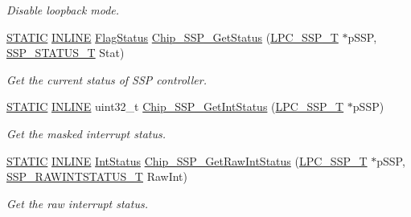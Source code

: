 \begin{DoxyCompactItemize}
\begin{DoxyCompactList}\small\item\em Disable loopback mode. \end{DoxyCompactList}\item 
\hyperlink{group___l_p_c___types___public___macros_ga10b2d890d871e1489bb02b7e70d9bdfb}{S\+T\+A\+T\+IC} \hyperlink{spifi__18xx__43xx_8h_a2eb6f9e0395b47b8d5e3eeae4fe0c116}{I\+N\+L\+I\+NE} \hyperlink{group___l_p_c___types___public___types_ga89136caac2e14c55151f527ac02daaff}{Flag\+Status} \hyperlink{group___s_s_p__18_x_x__43_x_x_ga82dd278bcdbd80eaacc43abc211a970f}{Chip\+\_\+\+S\+S\+P\+\_\+\+Get\+Status} (\hyperlink{struct_l_p_c___s_s_p___t}{L\+P\+C\+\_\+\+S\+S\+P\+\_\+T} $\ast$p\+S\+SP, \hyperlink{group___s_s_p__18_x_x__43_x_x_gad95eaf4325a2ec8e457b309d21d6987d}{S\+S\+P\+\_\+\+S\+T\+A\+T\+U\+S\+\_\+T} Stat)
\begin{DoxyCompactList}\small\item\em Get the current status of S\+SP controller. \end{DoxyCompactList}\item 
\hyperlink{group___l_p_c___types___public___macros_ga10b2d890d871e1489bb02b7e70d9bdfb}{S\+T\+A\+T\+IC} \hyperlink{spifi__18xx__43xx_8h_a2eb6f9e0395b47b8d5e3eeae4fe0c116}{I\+N\+L\+I\+NE} uint32\+\_\+t \hyperlink{group___s_s_p__18_x_x__43_x_x_ga207244e33021333a66bb04f2bd2f1102}{Chip\+\_\+\+S\+S\+P\+\_\+\+Get\+Int\+Status} (\hyperlink{struct_l_p_c___s_s_p___t}{L\+P\+C\+\_\+\+S\+S\+P\+\_\+T} $\ast$p\+S\+SP)
\begin{DoxyCompactList}\small\item\em Get the masked interrupt status. \end{DoxyCompactList}\item 
\hyperlink{group___l_p_c___types___public___macros_ga10b2d890d871e1489bb02b7e70d9bdfb}{S\+T\+A\+T\+IC} \hyperlink{spifi__18xx__43xx_8h_a2eb6f9e0395b47b8d5e3eeae4fe0c116}{I\+N\+L\+I\+NE} \hyperlink{group___l_p_c___types___public___types_gab7d263072f745b4f3913fb0afc434c4e}{Int\+Status} \hyperlink{group___s_s_p__18_x_x__43_x_x_ga0cc48f6c5bea491f2965b5b6fd0dcf69}{Chip\+\_\+\+S\+S\+P\+\_\+\+Get\+Raw\+Int\+Status} (\hyperlink{struct_l_p_c___s_s_p___t}{L\+P\+C\+\_\+\+S\+S\+P\+\_\+T} $\ast$p\+S\+SP, \hyperlink{group___s_s_p__18_x_x__43_x_x_gaf901cb9befcf9302650fed7f1ddba443}{S\+S\+P\+\_\+\+R\+A\+W\+I\+N\+T\+S\+T\+A\+T\+U\+S\+\_\+T} Raw\+Int)
\begin{DoxyCompactList}\small\item\em Get the raw interrupt status. \end{DoxyCompactList}\item 

\end{DoxyCompactItemize}
